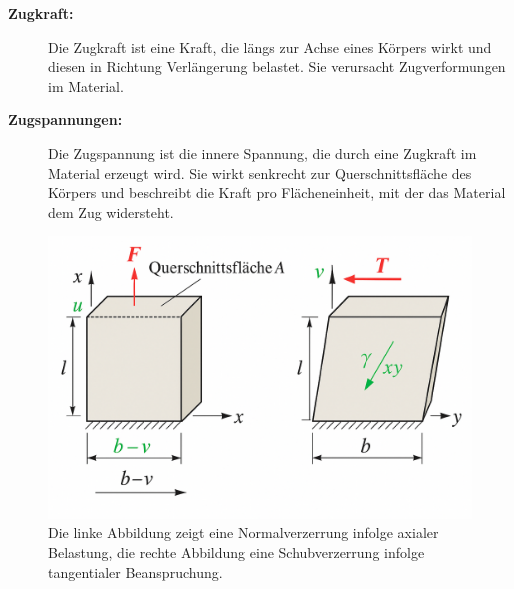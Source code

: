 \begin{description}
	\item[\textbf{Zugkraft:}] Die Zugkraft ist eine Kraft, die längs zur Achse eines Körpers wirkt und diesen in Richtung Verlängerung belastet. 
	Sie verursacht Zugverformungen im Material.
	
	\item[\textbf{Zugspannungen:}] Die Zugspannung ist die innere Spannung, die durch eine Zugkraft im Material erzeugt wird. 
	Sie wirkt senkrecht zur Querschnittsfläche des Körpers und beschreibt die Kraft pro Flächeneinheit, mit der das Material dem Zug widersteht.
\end{description}

\begin{figure} [h]
	\centering
	\includegraphics[width=\textwidth]{papers/elastomechanik/images/teil1/Zugverformung_Schubverformung.png}
	\caption{Die linke Abbildung zeigt eine Normalverzerrung infolge axialer Belastung, die rechte Abbildung eine Schubverzerrung infolge tangentialer Beanspruchung.}
	\label{fig:Zugverformung_Schubverformung}
\end{figure}

